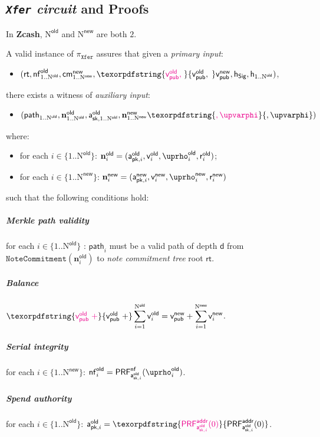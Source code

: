 \documentclass{article}
\newcommand{\changedcolor}{magenta}
\newcommand{\setchanged}{\color{\changedcolor}}
\newcommand{\changed}[1]{\texorpdfstring{{\setchanged{#1}}}{#1}}
\newcommand{\term}[1]{\textsl{#1}\xspace}
\newcommand{\termbf}[1]{\textbf{#1}\xspace}
\newcommand{\Zcash}{\termbf{Zcash}}
\newcommand{\coinCommitmentTree}{\term{note commitment tree}}
\newcommand{\setof}[1]{\{{#1}\}}
\newcommand{\AuthPublicOld}[1]{\mathsf{a^{old}_{pk,\mathnormal{#1}}}}
\newcommand{\AuthPrivateOld}[1]{\mathsf{a^{old}_{sk,\mathnormal{#1}}}}
\newcommand{\AuthPublicNew}[1]{\mathsf{a^{new}_{pk,\mathnormal{#1}}}}
\newcommand{\CoinCommitRandOld}[1]{\mathsf{r^{old}_\mathnormal{#1}}}
\newcommand{\CoinCommitRandNew}[1]{\mathsf{r^{new}_\mathnormal{#1}}}
\newcommand{\CoinAddressRandOld}[1]{\mathsf{\uprho^{old}_\mathnormal{#1}}}
\newcommand{\CoinAddressRandNew}[1]{\mathsf{\uprho^{new}_\mathnormal{#1}}}
\newcommand{\CoinAddressPreRand}{\mathsf{\upvarphi}}
\newcommand{\sn}{\mathsf{nf}}
\newcommand{\snOld}[1]{\sn^\mathsf{old}_\mathnormal{#1}}
\newcommand{\PRF}[2]{\mathsf{{PRF}^{#2}_\mathnormal{#1}}}
\newcommand{\PRFaddr}[1]{\PRF{#1}{addr}}
\newcommand{\PRFsn}[1]{\PRF{#1}{\sn}}
\newcommand{\cmNew}[1]{\mathsf{{cm}^{new}_\mathnormal{#1}}}
\newcommand{\MerkleDepth}{\mathsf{d}}
\newcommand{\vsum}[2]{\smashoperator[r]{\sum_{#1}^{#2}}}
\newcommand{\rt}{\mathsf{rt}}
\newcommand{\hSig}{\mathsf{h_{Sig}}}
\newcommand{\h}[1]{\mathsf{h_{\mathnormal{#1}}}}
\newcommand{\NOld}{\mathrm{N}^\mathsf{old}}
\newcommand{\NNew}{\mathrm{N}^\mathsf{new}}
\newcommand{\allN}[1]{\mathrm{1}..\mathrm{N}^\mathsf{#1}}
\newcommand{\allOld}{\allN{old}}
\newcommand{\allNew}{\allN{new}}
\newcommand{\setofOld}{\setof{\allOld}}
\newcommand{\setofNew}{\setof{\allNew}}
\newcommand{\PourCircuit}{\term{\texttt{Xfer} circuit}}
\newcommand{\PourStatement}{\texttt{Xfer}}
\newcommand{\PourProof}{\pi_{\PourStatement}}
\newcommand{\vpubOld}{\mathsf{v_{pub}^{old}}}
\newcommand{\vpubNew}{\mathsf{v_{pub}^{new}}}
\newcommand{\cOld}[1]{\mathbf{n}_{#1}^\mathsf{old}}
\newcommand{\cNew}[1]{\mathbf{n}_{#1}^\mathsf{new}}
\newcommand{\vOld}[1]{\mathsf{v}_{#1}^\mathsf{old}}
\newcommand{\vNew}[1]{\mathsf{v}_{#1}^\mathsf{new}}
\newcommand{\treepath}[1]{\mathsf{path}_{#1}}
\newcommand{\Commitment}{\mathtt{NoteCommitment}}
\begin{document}
\subsection{\PourCircuit and Proofs}

In \Zcash, $\NOld$ and $\NNew$ are both $2$.

A valid instance of $\PourProof$ assures that given a \term{primary input}:

\begin{itemize}
  \item[] $(\rt, \snOld{\allOld}, \cmNew{\allNew}, \changed{\vpubOld,\;}
\vpubNew, \hSig, \h{\allOld})$,
\end{itemize}

there exists a witness of \term{auxiliary input}:

\begin{itemize}
  \item[] $(\treepath{\allOld}, \cOld{\allOld}, \AuthPrivateOld{\allOld},
\cNew{\allNew}\changed{, \CoinAddressPreRand})$
\end{itemize}

where:

\begin{itemize}
  \item[] for each $i \in \setofOld$: $\cOld{i} = (\AuthPublicOld{i},
\vOld{i}, \CoinAddressRandOld{i}, \CoinCommitRandOld{i})$;
  \item[] for each $i \in \setofNew$: $\cNew{i} = (\AuthPublicNew{i},
\vNew{i}, \CoinAddressRandNew{i}, \CoinCommitRandNew{i})$
\end{itemize}

such that the following conditions hold:

\subparagraph{Merkle path validity}

for each $i \in \setofOld$ \changed{$\mid$ $\vOld{i} \neq 0$}:
$\treepath{i}$ must be a valid path of depth $\MerkleDepth$ from \linebreak
$\Commitment(\cOld{i})$ to \coinCommitmentTree root $\rt$.

\subparagraph{Balance}

$\changed{\vpubOld\; +} \vsum{i=1}{\NOld} \vOld{i} = \vpubNew + \vsum{i=1}{\NNew} \vNew{i}$.

\subparagraph{Serial integrity}

for each $i \in \setofNew$:
$\snOld{i} = \PRFsn{\AuthPrivateOld{i}}(\CoinAddressRandOld{i})$.

\subparagraph{Spend authority}

for each $i \in \setofOld$:
$\AuthPublicOld{i} = \changed{\PRFaddr{\AuthPrivateOld{i}}(0)}$.
\end{document}
